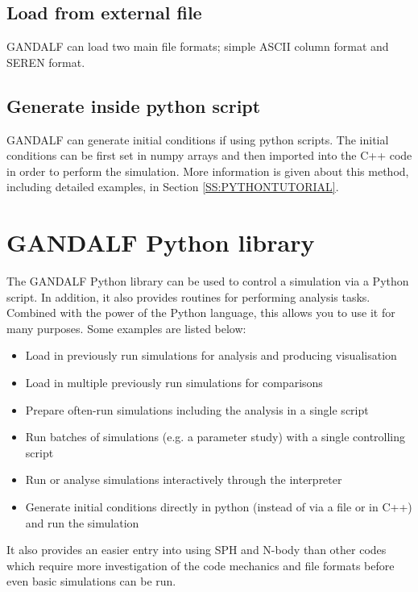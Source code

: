 \documentclass[a4paper]{article}
\begin{document}
\subsection{Load from external file}
GANDALF can load two main file formats; simple ASCII column format and SEREN format.

\subsection{Generate inside python script}
GANDALF can generate initial conditions if using python scripts.  The initial conditions can be first set in numpy arrays and then imported into the C++ code in order to perform the simulation.  More information is given about this method, including detailed examples, in Section \ref{SS:PYTHONTUTORIAL}.


\newpage



\section{GANDALF Python library} \label{S:PYTHONSCRIPT}

The GANDALF Python library can be used to control a simulation via a Python script. In addition, it also provides routines for performing analysis tasks. Combined with the power of the Python language, this allows you to use it for many purposes. Some examples are listed below:
\begin{itemize}
\item Load in previously run simulations for analysis and producing visualisation
\item Load in multiple previously run simulations for comparisons
\item Prepare often-run simulations including the analysis in a single script
\item Run batches of simulations (e.g. a parameter study) with a single controlling script
\item Run or analyse simulations interactively through the interpreter
\item Generate initial conditions directly in python (instead of via a file or in C++) and run the simulation
\end{itemize}
It also provides an easier entry into using SPH and N-body than other codes which require more investigation of the code mechanics and file formats before even basic simulations can be run.
\end{document}
